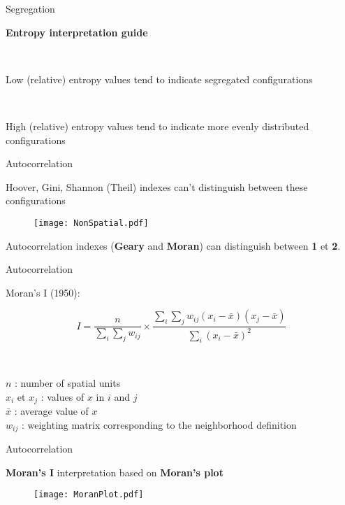 \begin{frame}{Segregation}

\textbf{Entropy interpretation guide}

~ 

Low (relative) entropy values tend to indicate segregated configurations

~

High (relative) entropy values tend to indicate more evenly distributed configurations



\end{frame}



\begin{frame}{Autocorrelation}

Hoover, Gini, Shannon (Theil) indexes can't distinguish between these configurations \\ 

\begin{figure}
\texttt{[image: NonSpatial.pdf]}
\end{figure}

Autocorrelation indexes (\textbf{Geary} and \textbf{Moran}) can distinguish between \textbf{1} et \textbf{2}.

\end{frame}


\begin{frame}{Autocorrelation}

Moran's I (1950):

$$
I = \frac{n}{\sum_{i} \sum_{j} w_{ij}} \times \frac{\sum_{i} \sum_{j} w_{ij} (x_i - \bar{x})(x_j - \bar{x})}{\sum_{i} (x_i - \bar{x})^2}
$$

~

$n$ : number of spatial units \\ 
$x_i$ et $x_j$ : values of $x$ in $i$ and $j$ \\ 
$\bar{x}$ : average value of $x$ \\ 
$w_{ij}$ : weighting matrix corresponding to the neighborhood definition

\end{frame}



\begin{frame}{Autocorrelation}

\textbf{Moran's I} interpretation based on \textbf{Moran's plot}

\begin{figure}
\texttt{[image: MoranPlot.pdf]}
\end{figure}

\end{frame}


